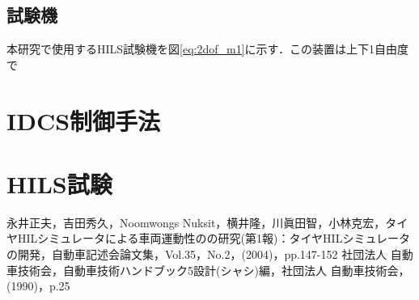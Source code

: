 \documentclass{article_vdlab_sotsuron_youshi}
\begin{document}
\subsection{試験機}
本研究で使用するHILS試験機を図\ref{eq:2dof_m1}に示す．この装置は上下1自由度で


\section{IDCS制御手法}

\section{HILS試験}

\begin{thebibliography}{99}
永井正夫，吉田秀久，Noomwongs Nuksit，横井隆，川眞田智，小林克宏，タイヤHILシミュレータによる車両運動性のの研究(第1報)：タイヤHILシミュレータの開発，自動車記述会論文集，Vol.35，No.2，(2004)，pp.147-152
社団法人 自動車技術会，自動車技術ハンドブック5設計(シャシ)編，社団法人 自動車技術会，(1990)，p.25
\end{thebibliography}
\end{document}
